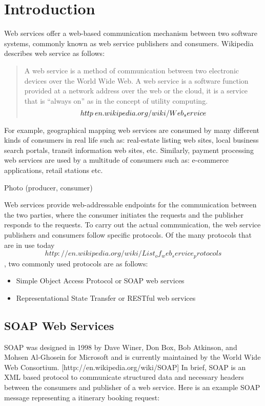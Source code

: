 \documentclass[runningheads,a4paper]{llncs}
\begin{document}
\section{Introduction}

Web services offer a web-based communication mechanism between two software systems, commonly known as web service publishers and consumers. Wikipedia describes web service as follows:

\begin{quote}
A web service is a method of communication between two electronic devices over the World Wide Web. A web service is a software function provided at a network address over the web or the cloud, it is a service that is ``always on'' as in the concept of utility computing. \[http\:\/\/en.wikipedia.org/wiki/Web_service\]
\end{quote}

For example, geographical mapping web services are consumed by many different kinds of consumers in real life such as: real-estate listing web sites, local business search portals, transit information web sites, etc. Similarly, payment processing web services are used by a multitude of consumers such as: e-commerce applications, retail stations etc.

Photo (producer, consumer)


Web services provide web-addressable endpoints for the communication between the two parties, where the consumer initiates the requests and the publisher responds to the requests. To carry out the actual communication, the web service publishers and consumers follow specific protocols. Of the many protocols that are in use today \[http://en.wikipedia.org/wiki/List_of_web_service_protocols\], two commonly used protocols are as follows:

\begin{itemize}
  \item Simple Object Access Protocol or SOAP web services
  \item Representational State Transfer or RESTful web services
\end{itemize}


\subsection{SOAP Web Services} %
\label{sub:soap_web_services}
SOAP was designed in 1998 by Dave Winer, Don Box, Bob Atkinson, and Mohsen Al-Ghosein for Microsoft and is currently maintained by the World Wide Web Consortium. [http://en.wikipedia.org/wiki/SOAP] In brief, SOAP is an XML based protocol to communicate structured data and necessary headers between the consumers and publisher of a web service. Here is an example SOAP message representing a itinerary booking request:
\end{document}
